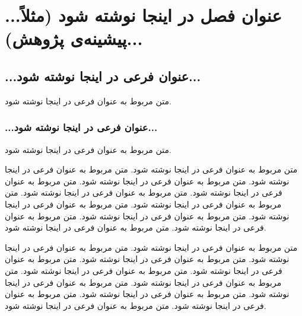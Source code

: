 \chapter{...عنوان فصل در اینجا نوشته شود (مثلاً پیشینه‌ی پژوهش)...}

\section{...عنوان فرعی در اینجا نوشته شود...}

متن مربوط به عنوان فرعی در اینجا نوشته شود.

\subsection{...عنوان فرعی در اینجا نوشته شود...}

متن مربوط به عنوان فرعی در اینجا نوشته شود.

\newpage
متن مربوط به عنوان فرعی در اینجا نوشته شود.
متن مربوط به عنوان فرعی در اینجا نوشته شود.
متن مربوط به عنوان فرعی در اینجا نوشته شود.
متن مربوط به عنوان فرعی در اینجا نوشته شود.
متن مربوط به عنوان فرعی در اینجا نوشته شود.
متن مربوط به عنوان فرعی در اینجا نوشته شود.
متن مربوط به عنوان فرعی در اینجا نوشته شود.
متن مربوط به عنوان فرعی در اینجا نوشته شود.
متن مربوط به عنوان فرعی در اینجا نوشته شود.
متن مربوط به عنوان فرعی در اینجا نوشته شود.

\newpage
متن مربوط به عنوان فرعی در اینجا نوشته شود.
متن مربوط به عنوان فرعی در اینجا نوشته شود.
متن مربوط به عنوان فرعی در اینجا نوشته شود.
متن مربوط به عنوان فرعی در اینجا نوشته شود.
متن مربوط به عنوان فرعی در اینجا نوشته شود.
متن مربوط به عنوان فرعی در اینجا نوشته شود.
متن مربوط به عنوان فرعی در اینجا نوشته شود.
متن مربوط به عنوان فرعی در اینجا نوشته شود.
متن مربوط به عنوان فرعی در اینجا نوشته شود.
متن مربوط به عنوان فرعی در اینجا نوشته شود.
